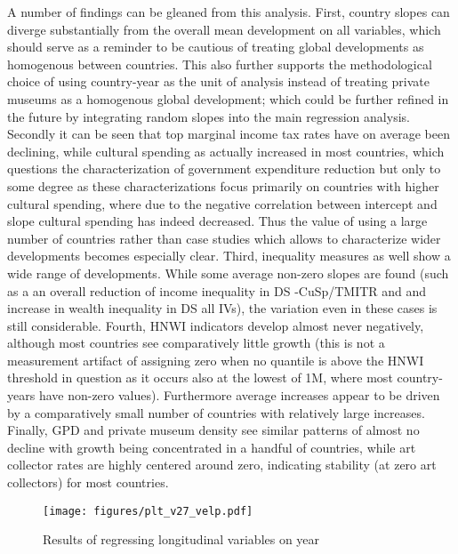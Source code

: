 \documentclass[11pt]{article}
\begin{document}
A number of findings can be gleaned from this analysis.
First, country slopes can diverge substantially from the overall mean development on all variables, which should serve as a reminder to be cautious of treating global developments as homogenous between countries. 
This also further supports the methodological choice of using country-year as the unit of analysis instead of treating private museums as a homogenous global development; which could be further refined in the future by integrating random slopes into the main regression analysis.
Secondly it can be seen that top marginal income tax rates have on average been declining, while cultural spending as actually increased in most countries, which questions the characterization of government expenditure reduction but only to some degree as these characterizations focus primarily on countries with higher cultural spending, where due to the negative correlation between intercept and slope cultural spending has indeed decreased.
Thus the value of using a large number of countries rather than case studies which allows to characterize wider developments becomes especially clear.
Third, inequality measures as well show a wide range of developments.
While some average non-zero slopes are found (such as a an overall reduction of income inequality in DS -CuSp/TMITR and and increase in wealth inequality in DS all IVs), the variation even in these cases is still considerable. 
Fourth, HNWI indicators develop almost never negatively, although most countries see comparatively little growth (this is not a measurement artifact of assigning zero when no quantile is above the HNWI threshold in question as it occurs also at the lowest of 1M, where most country-years have non-zero values).
Furthermore average increases appear to be driven by a comparatively small number of countries with relatively large increases. 
Finally, GPD and private museum density see similar patterns of almost no decline with growth being concentrated in a handful of countries, while art collector rates are highly centered around zero, indicating stability (at zero art collectors) for most countries. 



\begin{landscape}

\begin{figure}[htbp]
\centering
\texttt{[image: figures/plt\_v27\_velp.pdf]}
\caption{\label{fig:velp}Results of regressing longitudinal variables on year}
\end{figure}

\end{landscape}
\end{document}
